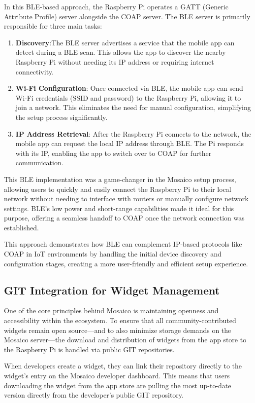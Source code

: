 In this BLE-based approach, the Raspberry Pi operates a GATT (Generic Attribute Profile) server alongside the COAP server. The BLE server is primarily responsible for three main tasks:

\begin{enumerate}
    \item \textbf{Discovery}:The BLE server advertises a service that the mobile app can detect during a BLE scan. This allows the app to discover the nearby Raspberry Pi without needing its IP address or requiring internet connectivity.
    \item \textbf{Wi-Fi Configuration}: Once connected via BLE, the mobile app can send Wi-Fi credentials (SSID and password) to the Raspberry Pi, allowing it to join a network. This eliminates the need for manual configuration, simplifying the setup process significantly.
    \item \textbf{IP Address Retrieval}: After the Raspberry Pi connects to the network, the mobile app can request the local IP address through BLE. The Pi responds with its IP, enabling the app to switch over to COAP for further communication.
\end{enumerate}
This BLE implementation was a game-changer in the Mosaico setup process, allowing users to quickly and easily connect the Raspberry Pi to their local network without needing to interface with routers or manually configure network settings. BLE's low power and short-range capabilities made it ideal for this purpose, offering a seamless handoff to COAP once the network connection was established.

This approach demonstrates how BLE can complement IP-based protocols like COAP in IoT environments by handling the initial device discovery and configuration stages, creating a more user-friendly and efficient setup experience.

\subsection{GIT Integration for Widget Management}

One of the core principles behind Mosaico is maintaining openness and accessibility within the ecosystem. To ensure that all community-contributed widgets remain open source—and to also minimize storage demands on the Mosaico server—the download and distribution of widgets from the app store to the Raspberry Pi is handled via public GIT repositories.

When developers create a widget, they can link their repository directly to the widget's entry on the Mosaico developer dashboard. This means that users downloading the widget from the app store are pulling the most up-to-date version directly from the developer’s public GIT repository.

